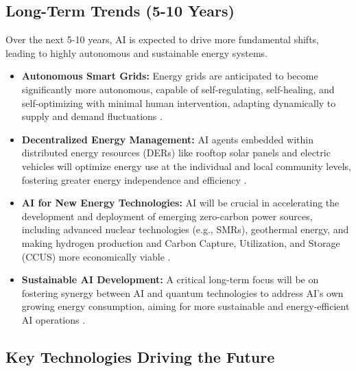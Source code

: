 \subsection{Long-Term Trends (5-10 Years)}
Over the next 5-10 years, AI is expected to drive more fundamental shifts, leading to highly autonomous and sustainable energy systems.
\begin{itemize}
    \item \textbf{Autonomous Smart Grids:} Energy grids are anticipated to become significantly more autonomous, capable of self-regulating, self-healing, and self-optimizing with minimal human intervention, adapting dynamically to supply and demand fluctuations \cite{Medium_FutureTrends, Exatonix_FutureTrends}.
    \item \textbf{Decentralized Energy Management:} AI agents embedded within distributed energy resources (DERs) like rooftop solar panels and electric vehicles will optimize energy use at the individual and local community levels, fostering greater energy independence and efficiency \cite{GCPIT_FutureTrends}.
    \item \textbf{AI for New Energy Technologies:} AI will be crucial in accelerating the development and deployment of emerging zero-carbon power sources, including advanced nuclear technologies (e.g., SMRs), geothermal energy, and making hydrogen production and Carbon Capture, Utilization, and Storage (CCUS) more economically viable \cite{Woodmac_FutureTrends}.
    \item \textbf{Sustainable AI Development:} A critical long-term focus will be on fostering synergy between AI and quantum technologies to address AI's own growing energy consumption, aiming for more sustainable and energy-efficient AI operations \cite{WEF_AI_Quantum}.
\end{itemize}

\subsection{Key Technologies Driving the Future}


